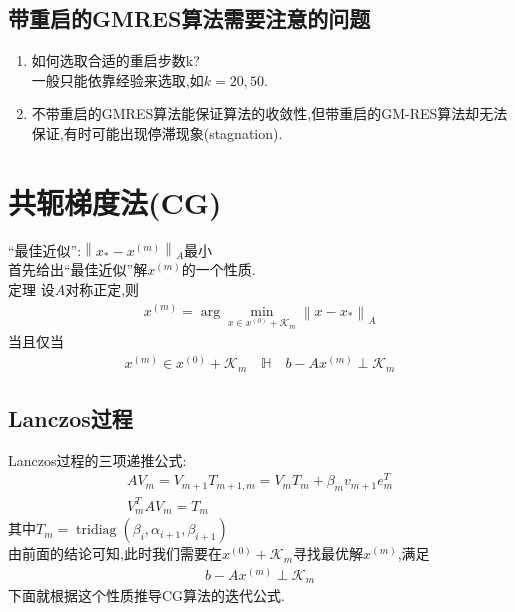 \documentclass[12pt,a4paper]{article}
\begin{document}
\subsection*{带重启的GMRES算法需要注意的问题}
\begin{enumerate}[(1)]
\item 如何选取合适的重启步数k?\\
{\color{blue}一般只能依靠经验来选取,如$k= 20,50$}.
\item 不带重启的GMRES算法能保证算法的收敛性,但带重启的GM-RES算法却无法保证,有时可能出现停滞现象(stagnation).
\end{enumerate}
\section{\color{blue}共轭梯度法(CG)}
{\color{blue}“最佳近似”:$\left\|x_{*}-x^{(m)}\right\|_{A}$最小}\\
首先给出“最佳近似”解$x^{(m)}$的一个性质.\\
{\color{blue}定理}
设$A$对称正定,则
\begin{align*}
x^{(m)}=\arg \min _{x \in x^{(0)}+\mathcal{K}_{m}}\left\|x-x_{*}\right\|_{A}\tag{7.7}
\end{align*}
当且仅当
\begin{align*}
x^{(m)} \in x^{(0)}+\mathcal{K}_{m} \quad \mathbb{H} \quad b-A x^{(m)} \perp \mathcal{K}_{m}
\tag{7.8}
\end{align*}
\subsection*{Lanczos过程}
Lanczos过程的{\color{blue}三项递推公式}:
$$
\begin{array}{l}{A V_{m}=V_{m+1} T_{m+1, m}=V_{m} T_{m}+\beta_{m} v_{m+1} e_{m}^{T}} \\ {V_{m}^{T} A V_{m}=T_{m}}\end{array}
$$
其中$T_{m}=\operatorname{tridiag}\left(\beta_{i}, \alpha_{i+1}, \beta_{i+1}\right)$\\
由前面的结论可知,此时我们需要在$x^{(0)}+\mathcal{K}_{m}$寻找最优解$x^{(m)}$,满足
\begin{align*}
b-A x^{(m)} \perp \mathcal{K}_{m}
\tag{7.9}
\end{align*}
下面就根据这个性质推导CG算法的迭代公式.
\end{document}
